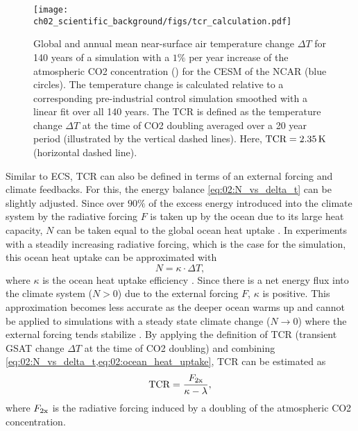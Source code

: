 \begin{figure}[t]
  \centering
  \texttt{[image: 
    ch02\_scientific\_background/figs/tcr\_calculation.pdf]}
  \caption{Global and annual mean near-surface air temperature change $\Delta
    T$ for 140 years of a simulation with a $1 \unit{\%}$ per year increase of
    the atmospheric \acs{CO2} concentration (\onepctcotwo{}) for the \acf{CESM}
    of the \acf{NCAR} (blue circles). The temperature change is calculated
    relative to a corresponding pre-industrial control simulation smoothed
    with a linear fit over all 140 years. The \acf{TCR} is defined as the
    temperature change $\Delta T$ at the time of \acs{CO2} doubling averaged
    over a 20 year period (illustrated by the vertical dashed lines). Here,
    $\mathtxt{TCR} = 2.35 \unit{K}$ (horizontal dashed line).}
  \label{fig:02:tcr}
\end{figure}

Similar to \ac{ECS}, \ac{TCR} can also be defined in terms of an external
forcing and climate feedbacks. For this, the energy balance
\cref{eq:02:N_vs_delta_t} can be slightly adjusted. Since over $90 \unit{\%}$
of the excess energy introduced into the climate system by the radiative
forcing $F$ is taken up by the ocean due to its large heat capacity, $N$ can be
taken equal to the global ocean heat uptake \autocite{Knutti2017}. In
experiments with a steadily increasing radiative forcing, which is the case for
the \onepctcotwo{} simulation, this ocean heat uptake can be approximated with
\begin{equation}
  N = \kappa \cdot \Delta T,
  \label{eq:02:ocean_heat_uptake}
\end{equation}
where $\kappa$ is the ocean heat uptake efficiency \autocite{Gregory2008}.
Since there is a net energy flux into the climate system ($N > 0$) due to the
external forcing $F$, $\kappa$ is positive. This approximation becomes less
accurate as the deeper ocean warms up and cannot be applied to simulations with
a steady state climate change ($N \to 0$) where the external forcing tends
stabilize \autocite{Gregory2009}. By applying the definition of \ac{TCR}
(transient \ac{GSAT} change $\Delta T$ at the time of \ac{CO2} doubling) and
combining \cref{eq:02:N_vs_delta_t,eq:02:ocean_heat_uptake}, \ac{TCR} can be
estimated as
\begin{equation}
  \mathtxt{TCR} = \frac{F_\mathtxt{2x}}{\kappa - \lambda},
  \label{eq:02:tcr}
\end{equation}
where $F_\mathtxt{2x}$ is the radiative forcing induced by a doubling of the
atmospheric \ac{CO2} concentration.

